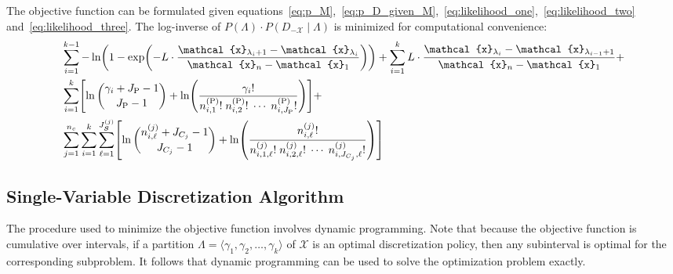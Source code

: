 \documentclass[twoside,11pt]{article}
\newcommand{\paren}[1]{\mathopen{}\mathclose\bgroup\left(#1\aftergroup\egroup\right)}
\newcommand{\brock}[1]{\mathopen{}\mathclose\bgroup\left[#1\aftergroup\egroup\right]}
\newcommand{\anglebrackets}[1]{\langle #1 \rangle}
\newcommand{\cX}{\mathcal{X}} %
\newcommand{\cx}{\mathcal{x}} %
\begin{document}
The objective function can be formulated given equations~\ref{eq:p_M},~\ref{eq:p_D_given_M},~\ref{eq:likelihood_one},~\ref{eq:likelihood_two} and~\ref{eq:likelihood_three}.
The log-inverse of $P(\Lambda) \cdot P(D_{-\cX} \mid \Lambda)$ is minimized for computational convenience:
\begin{equation}
\label{eq:opt_prob}
\begin{aligned}
  & \sum_{i=1}^{k-1}
   - \ln
    \paren{
      1 - \exp
      \paren{
        - L \cdot  \frac{
                         \cx_{\lambda_i +1} - \cx_{\lambda_i}
                       }{
                         \cx_n - \cx_1
                        }
      }
    }
      + \sum_{i=1}^{k}
      L \cdot \frac{\cx_{\lambda_{i}} - \cx_{\lambda_{i-1} + 1}}{\cx_n - \cx_1} + \\
  & \sum_{i=1}^{k} \brock{
  \ln{{\gamma_i + J_\text{P} - 1}\choose{J_\text{P} - 1}}
  +{ \ln \paren{
        \frac{
          {\gamma_i}!
        }{
          {n^{(\text{P})}_{i,1}}! \; {n^{(\text{P})}_{i,2}}! \; \cdots \; {n^{(\text{P})}_{i,J_\text{P}}}!
        }
      }}
  } + \\
  & \sum_{j=1}^{n_c} \sum_{i=1}^k \sum_{\ell=1}^{J^{(j)}_{\bm{S}}} \brock{
  { \ln
          {{n^{(j)}_{i,\ell} + J_{C_j} - 1}\choose{J_{C_j}-1}}}
    +
    \ln \paren{ {
          \frac{
            {n^{(j)}_{i,\ell}}!
          }{
            {n^{(j)}_{i,1,\ell}!} \; {n^{(j)}_{i,2,\ell}!} \; \cdots \; {n^{(j)}_{i,J_{C_j},\ell}!}
          }
        }
        } }
\end{aligned}
\end{equation}



\subsection{Single-Variable Discretization Algorithm}
\label{subsec:algo}

The procedure used to minimize the objective function involves dynamic programming.
Note that because the objective function is cumulative over intervals, if a partition $\Lambda = \anglebrackets{\gamma_1, \gamma_2, \ldots, \gamma_k}$ of $\cX$ is an optimal discretization policy, then any subinterval is optimal for the corresponding subproblem.
It follows that dynamic programming can be used to solve the optimization problem exactly.
\end{document}
